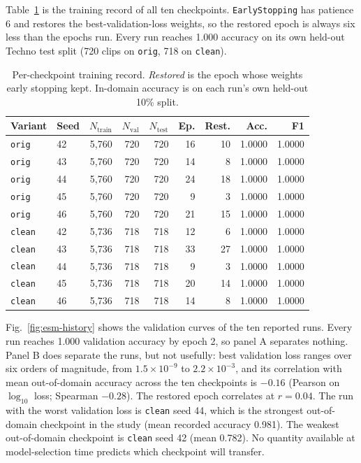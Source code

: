 \documentclass[pdflatex,sn-mathphys-num]{sn-jnl}
\begin{document}
Table~\ref{tab:esm-checkpoints} is the training record of all ten checkpoints. \texttt{EarlyStopping} has patience 6 and restores the best-validation-loss weights, so the restored epoch is always six less than the epochs run. Every run reaches 1.000 accuracy on its own held-out Techno test split (720 clips on \texttt{orig}, 718 on \texttt{clean}).

\begin{table}[t]
\caption{Per-checkpoint training record. \emph{Restored} is the epoch whose weights early stopping kept. In-domain accuracy is on each run's own held-out 10\% split.}\label{tab:esm-checkpoints}
\setlength{\tabcolsep}{3.2pt}
\begin{tabular}{@{}llrrrrrrr@{}}
\toprule
Variant & Seed & $N_{\text{train}}$ & $N_{\text{val}}$ & $N_{\text{test}}$ & Ep. & Rest. & Acc. & F1 \\
\midrule
\texttt{orig} & 42 & 5{,}760 & 720 & 720 & 16 & 10 & 1.0000 & 1.0000 \\
\texttt{orig} & 43 & 5{,}760 & 720 & 720 & 14 & 8 & 1.0000 & 1.0000 \\
\texttt{orig} & 44 & 5{,}760 & 720 & 720 & 24 & 18 & 1.0000 & 1.0000 \\
\texttt{orig} & 45 & 5{,}760 & 720 & 720 & 9 & 3 & 1.0000 & 1.0000 \\
\texttt{orig} & 46 & 5{,}760 & 720 & 720 & 21 & 15 & 1.0000 & 1.0000 \\
\texttt{clean} & 42 & 5{,}736 & 718 & 718 & 12 & 6 & 1.0000 & 1.0000 \\
\texttt{clean} & 43 & 5{,}736 & 718 & 718 & 33 & 27 & 1.0000 & 1.0000 \\
\texttt{clean} & 44 & 5{,}736 & 718 & 718 & 9 & 3 & 1.0000 & 1.0000 \\
\texttt{clean} & 45 & 5{,}736 & 718 & 718 & 20 & 14 & 1.0000 & 1.0000 \\
\texttt{clean} & 46 & 5{,}736 & 718 & 718 & 14 & 8 & 1.0000 & 1.0000 \\
\bottomrule
\end{tabular}
\end{table}

Fig.~\ref{fig:esm-history} shows the validation curves of the ten reported runs. Every run reaches 1.000 validation accuracy by epoch 2, so panel A separates nothing. Panel B does separate the runs, but not usefully: best validation loss ranges over six orders of magnitude, from $1.5\times10^{-9}$ to $2.2\times10^{-3}$, and its correlation with mean out-of-domain accuracy across the ten checkpoints is $-0.16$ (Pearson on $\log_{10}$ loss; Spearman $-0.28$). The restored epoch correlates at $r=0.04$. The run with the worst validation loss is \texttt{clean} seed 44, which is the strongest out-of-domain checkpoint in the study (mean recorded accuracy 0.981). The weakest out-of-domain checkpoint is \texttt{clean} seed 42 (mean 0.782). No quantity available at model-selection time predicts which checkpoint will transfer.
\end{document}
